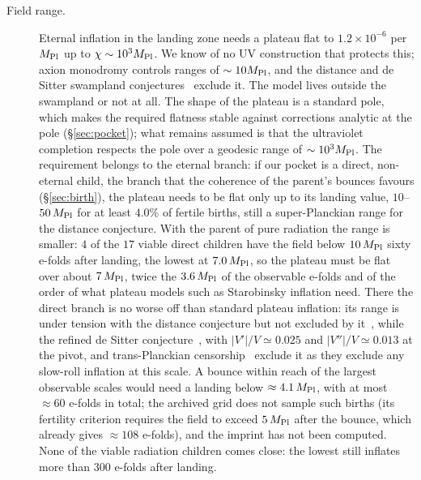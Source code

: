 \documentclass[11pt,a4paper]{article}
\newcommand{\Mpl}{M_{\rm Pl}}
\begin{document}
\begin{description}
\item[Field range.] Eternal inflation in the landing zone needs a plateau flat to $1.2\times10^{-6}$ per $\Mpl$ up to $\chi\sim10^3\Mpl$. We know of no UV construction that protects this; axion monodromy controls ranges of $\sim10\Mpl$, and the distance and de Sitter swampland conjectures~\cite{Obied2018} exclude it. The model lives outside the swampland or not at all. The shape of the plateau is a standard pole, which makes the required flatness stable against corrections analytic at the pole (\S\ref{sec:pocket}); what remains assumed is that the ultraviolet completion respects the pole over a geodesic range of $\sim10^3\Mpl$. The requirement belongs to the eternal branch: if our pocket is a direct, non-eternal child, the branch that the coherence of the parent's bounces favours (\S\ref{sec:birth}), the plateau needs to be flat only up to its landing value, $10$--$50\,\Mpl$ for at least $4.0\%$ of fertile births, still a super-Planckian range for the distance conjecture. With the parent of pure radiation the range is smaller: $4$ of the $17$ viable direct children have the field below $10\,\Mpl$ sixty e-folds after landing, the lowest at $7.0\,\Mpl$, so the plateau must be flat over about $7\,\Mpl$, twice the $3.6\,\Mpl$ of the observable e-folds and of the order of what plateau models such as Starobinsky inflation need. There the direct branch is no worse off than standard plateau inflation: its range is under tension with the distance conjecture but not excluded by it~\cite{ScalisiValenzuela2019}, while the refined de Sitter conjecture~\cite{OPSV2018}, with $|V'|/V\simeq0.025$ and $|V''|/V\simeq0.013$ at the pivot, and trans-Planckian censorship~\cite{BBLV2019} exclude it as they exclude any slow-roll inflation at this scale. A bounce within reach of the largest observable scales would need a landing below $\approx4.1\,\Mpl$, with at most $\approx60$ e-folds in total; the archived grid does not sample such births (its fertility criterion requires the field to exceed $5\,\Mpl$ after the bounce, which already gives $\approx108$ e-folds), and the imprint has not been computed. None of the viable radiation children comes close: the lowest still inflates more than $300$ e-folds after landing.

\end{description}
\end{document}
